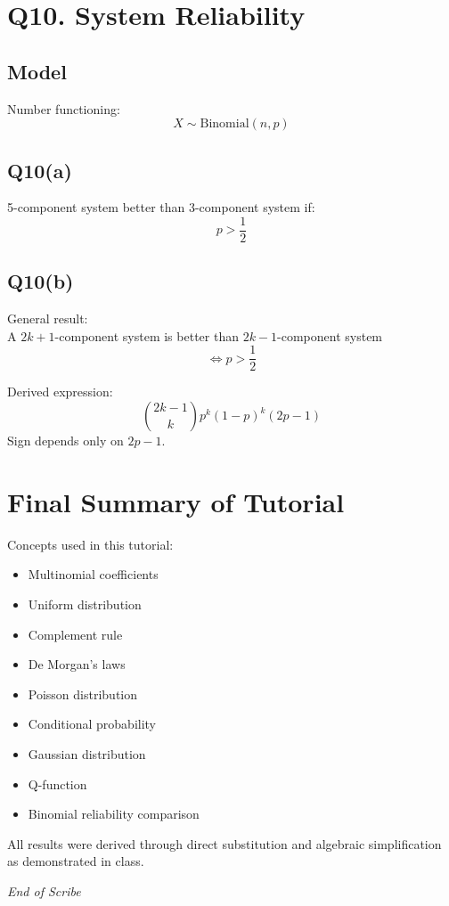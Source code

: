 \documentclass[11pt]{article}
\begin{document}
\section{Q10. System Reliability}

\subsection{Model}
Number functioning:
\[ X \sim \text{Binomial}(n,p) \]

\subsection{Q10(a)}
5-component system better than 3-component system if:
\[ p > \frac{1}{2} \]

\subsection{Q10(b)}
General result: \\
A $2k+1$-component system is better than $2k-1$-component system
\[ \iff p > \frac{1}{2} \]

Derived expression:
\[ \binom{2k-1}{k} p^k (1-p)^k (2p-1) \]
Sign depends only on $2p-1$.

\section{Final Summary of Tutorial}
Concepts used in this tutorial:
\begin{itemize}
    \item Multinomial coefficients
    \item Uniform distribution
    \item Complement rule
    \item De Morgan’s laws
    \item Poisson distribution
    \item Conditional probability
    \item Gaussian distribution
    \item Q-function
    \item Binomial reliability comparison
\end{itemize}
All results were derived through direct substitution and algebraic simplification as demonstrated in class.

\vspace{0.5cm}
\begin{center}
    \small \textit{End of Scribe}
\end{center}
\end{document}
